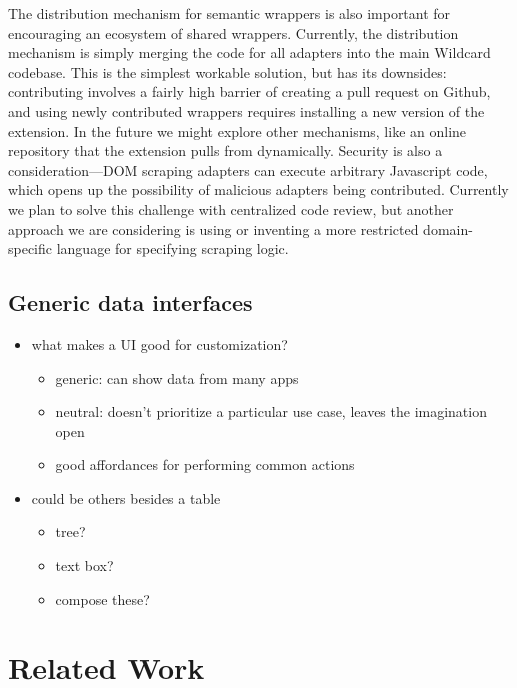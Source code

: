 \documentclass[sigplan,screen,10pt,anonymous,review]{acmart}
\providecommand{\tightlist}{%
  \setlength{\itemsep}{0pt}\setlength{\parskip}{0pt}}
\begin{document}
The distribution mechanism for semantic wrappers is also important for
encouraging an ecosystem of shared wrappers. Currently, the distribution
mechanism is simply merging the code for all adapters into the main
Wildcard codebase. This is the simplest workable solution, but has its
downsides: contributing involves a fairly high barrier of creating a
pull request on Github, and using newly contributed wrappers requires
installing a new version of the extension. In the future we might
explore other mechanisms, like an online repository that the extension
pulls from dynamically. Security is also a consideration---DOM scraping
adapters can execute arbitrary Javascript code, which opens up the
possibility of malicious adapters being contributed. Currently we plan
to solve this challenge with centralized code review, but another
approach we are considering is using or inventing a more restricted
domain-specific language for specifying scraping logic.

\hypertarget{generic-data-interfaces}{%
\subsection{Generic data interfaces}\label{generic-data-interfaces}}

\begin{itemize}
\item
  what makes a UI good for customization?

  \begin{itemize}
  \tightlist
  \item
    generic: can show data from many apps
  \item
    neutral: doesn't prioritize a particular use case, leaves the
    imagination open
  \item
    good affordances for performing common actions
  \end{itemize}
\item
  could be others besides a table

  \begin{itemize}
  \tightlist
  \item
    tree?
  \item
    text box?
  \item
    compose these?
  \end{itemize}
\end{itemize}

\hypertarget{sec:related-work}{%
\section{Related Work}\label{sec:related-work}}
\end{document}
